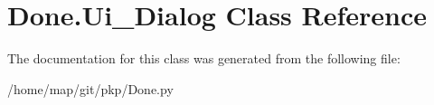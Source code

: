 \hypertarget{classDone_1_1Ui__Dialog}{\section{\-Done.\-Ui\-\_\-\-Dialog \-Class \-Reference}
\label{classDone_1_1Ui__Dialog}
}


\-The documentation for this class was generated from the following file\-:\begin{DoxyCompactItemize}
\item 
/home/map/git/pkp/\-Done.\-py\end{DoxyCompactItemize}
